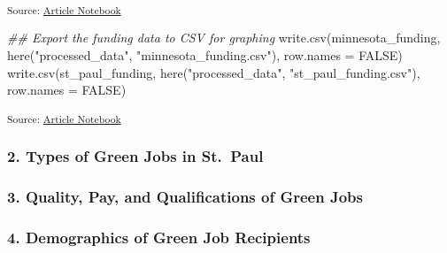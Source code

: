 \documentclass[
  letterpaper,
  DIV=11,
  numbers=noendperiod]{scrartcl}
\newenvironment{Shaded}{\begin{snugshade}}{\end{snugshade}}
\newcommand{\AttributeTok}[1]{\textcolor[rgb]{0.40,0.45,0.13}{#1}}
\newcommand{\ConstantTok}[1]{\textcolor[rgb]{0.56,0.35,0.01}{#1}}
\newcommand{\DocumentationTok}[1]{\textcolor[rgb]{0.37,0.37,0.37}{\textit{#1}}}
\newcommand{\FunctionTok}[1]{\textcolor[rgb]{0.28,0.35,0.67}{#1}}
\newcommand{\NormalTok}[1]{\textcolor[rgb]{0.00,0.23,0.31}{#1}}
\newcommand{\StringTok}[1]{\textcolor[rgb]{0.13,0.47,0.30}{#1}}
\begin{document}
\textsubscript{Source:
\href{https://beeckcenter.github.io/climate-equity-workforce/index-preview.html}{Article
Notebook}}

\begin{Shaded}
\begin{Highlighting}[]
\DocumentationTok{\#\# Export the funding data to CSV for graphing}
\FunctionTok{write.csv}\NormalTok{(minnesota\_funding, }\FunctionTok{here}\NormalTok{(}\StringTok{"processed\_data"}\NormalTok{, }\StringTok{"minnesota\_funding.csv"}\NormalTok{), }\AttributeTok{row.names =} \ConstantTok{FALSE}\NormalTok{)}
\FunctionTok{write.csv}\NormalTok{(st\_paul\_funding, }\FunctionTok{here}\NormalTok{(}\StringTok{"processed\_data"}\NormalTok{, }\StringTok{"st\_paul\_funding.csv"}\NormalTok{), }\AttributeTok{row.names =} \ConstantTok{FALSE}\NormalTok{)}
\end{Highlighting}
\end{Shaded}

\textsubscript{Source:
\href{https://beeckcenter.github.io/climate-equity-workforce/index-preview.html}{Article
Notebook}}

\subsubsection{2. Types of Green Jobs in
St.~Paul}\label{types-of-green-jobs-in-st.-paul}

\subsubsection{3. Quality, Pay, and Qualifications of Green
Jobs}\label{quality-pay-and-qualifications-of-green-jobs}

\subsubsection{4. Demographics of Green Job
Recipients}\label{demographics-of-green-job-recipients}
\end{document}
